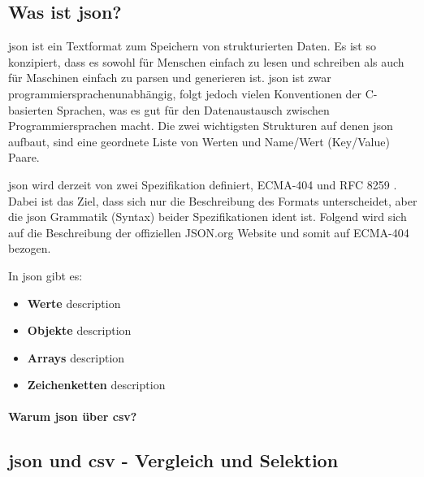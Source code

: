 \subsection{Was ist \acs{json}?}
\acf{json} ist ein Textformat zum Speichern von strukturierten Daten. Es ist so konzipiert, dass es sowohl für Menschen einfach zu lesen und schreiben als auch für Maschinen einfach zu parsen und generieren ist. \acs{json} ist zwar programmiersprachenunabhängig, folgt jedoch vielen Konventionen der C-basierten Sprachen, was es gut für den Datenaustausch zwischen Programmiersprachen macht. Die zwei wichtigsten Strukturen auf denen \acs{json} aufbaut, sind eine geordnete Liste von Werten und Name/Wert (Key/Value) Paare. \cite{json_org:o.J.} 

\acs{json} wird derzeit von zwei Spezifikation definiert, ECMA-404 \cite{ECMA:2017} und RFC 8259 \cite{Bray:2017}. Dabei ist das Ziel, dass sich nur die Beschreibung des Formats unterscheidet, aber die \acs{json} Grammatik (Syntax) beider Spezifikationen ident ist. Folgend wird sich auf die Beschreibung der offiziellen JSON.org Website \cite{json_org:o.J.} und somit auf ECMA-404 \cite{ECMA:2017} bezogen.

In \acs{json} gibt es:
\begin{itemize}
	\item \textbf{Werte} description
	
	\item \textbf{Objekte} description
	
	\item \textbf{Arrays} description
	
	\item \textbf{Zeichenketten} description
\end{itemize}

\paragraph{Warum \acs{json} über \acs{csv}?}
\cite{SQLizer:2017}

\subsection{\acs{json} und \acs{csv} - Vergleich und Selektion}